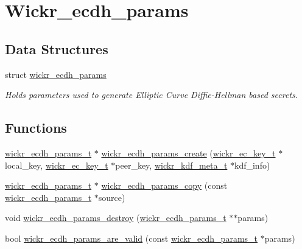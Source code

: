 \hypertarget{group__wickr__ecdh__params}{}\section{Wickr\+\_\+ecdh\+\_\+params}
\label{group__wickr__ecdh__params}
\subsection*{Data Structures}
\begin{DoxyCompactItemize}
\item 
struct \hyperlink{structwickr__ecdh__params}{wickr\+\_\+ecdh\+\_\+params}
\begin{DoxyCompactList}\small\item\em Holds parameters used to generate Elliptic Curve Diffie-\/\+Hellman based secrets. \end{DoxyCompactList}\end{DoxyCompactItemize}
\subsection*{Functions}
\begin{DoxyCompactItemize}
\item 
\hyperlink{structwickr__ecdh__params}{wickr\+\_\+ecdh\+\_\+params\+\_\+t} $\ast$ \hyperlink{group__wickr__ecdh__params_ga8a5be72f13caa4bf5ee99e16cc3b092f}{wickr\+\_\+ecdh\+\_\+params\+\_\+create} (\hyperlink{structwickr__ec__key}{wickr\+\_\+ec\+\_\+key\+\_\+t} $\ast$local\+\_\+key, \hyperlink{structwickr__ec__key}{wickr\+\_\+ec\+\_\+key\+\_\+t} $\ast$peer\+\_\+key, \hyperlink{structwickr__kdf__meta}{wickr\+\_\+kdf\+\_\+meta\+\_\+t} $\ast$kdf\+\_\+info)
\item 
\hyperlink{structwickr__ecdh__params}{wickr\+\_\+ecdh\+\_\+params\+\_\+t} $\ast$ \hyperlink{group__wickr__ecdh__params_ga016f2b643f2636c05ed72bc08a0314f0}{wickr\+\_\+ecdh\+\_\+params\+\_\+copy} (const \hyperlink{structwickr__ecdh__params}{wickr\+\_\+ecdh\+\_\+params\+\_\+t} $\ast$source)
\item 
void \hyperlink{group__wickr__ecdh__params_gaf6efcaf58f603e323443063cde9b5621}{wickr\+\_\+ecdh\+\_\+params\+\_\+destroy} (\hyperlink{structwickr__ecdh__params}{wickr\+\_\+ecdh\+\_\+params\+\_\+t} $\ast$$\ast$params)
\item 
bool \hyperlink{group__wickr__ecdh__params_ga801f1bfae11ac0c94d59bf9dd58f78aa}{wickr\+\_\+ecdh\+\_\+params\+\_\+are\+\_\+valid} (const \hyperlink{structwickr__ecdh__params}{wickr\+\_\+ecdh\+\_\+params\+\_\+t} $\ast$params)
\end{DoxyCompactItemize}


